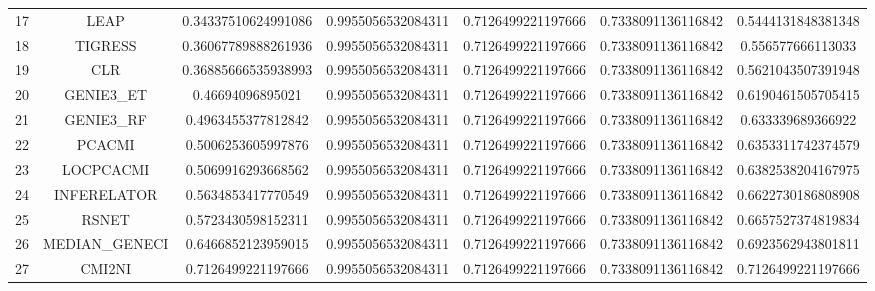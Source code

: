 \documentclass[a4paper,10pt]{article}
\begin{document}
\begin{landscape}
\begin{table}[!htp]
\begin{tabular}{ccccccc}
17&LEAP&0.34337510624991086&0.9955056532084311&0.7126499221197666&0.7338091136116842&0.5444131848381348\\
18&TIGRESS&0.36067789888261936&0.9955056532084311&0.7126499221197666&0.7338091136116842&0.556577666113033\\
19&CLR&0.36885666535938993&0.9955056532084311&0.7126499221197666&0.7338091136116842&0.5621043507391948\\
20&GENIE3_ET&0.46694096895021&0.9955056532084311&0.7126499221197666&0.7338091136116842&0.6190461505705415\\
21&GENIE3_RF&0.4963455377812842&0.9955056532084311&0.7126499221197666&0.7338091136116842&0.633339689366922\\
22&PCACMI&0.5006253605997876&0.9955056532084311&0.7126499221197666&0.7338091136116842&0.6353311742374579\\
23&LOCPCACMI&0.5069916293668562&0.9955056532084311&0.7126499221197666&0.7338091136116842&0.6382538204167975\\
24&INFERELATOR&0.5634853417770549&0.9955056532084311&0.7126499221197666&0.7338091136116842&0.6622730186808908\\
25&RSNET&0.5723430598152311&0.9955056532084311&0.7126499221197666&0.7338091136116842&0.6657527374819834\\
26&MEDIAN_GENECI&0.6466852123959015&0.9955056532084311&0.7126499221197666&0.7338091136116842&0.6923562943801811\\
27&CMI2NI&0.7126499221197666&0.9955056532084311&0.7126499221197666&0.7338091136116842&0.7126499221197666\\
\hline
\end{tabular}
\end{table}

\end{landscape}
\end{document}
